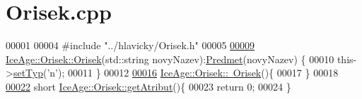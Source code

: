 \hypertarget{Orisek_8cpp_source}{}\section{Orisek.\+cpp}
\label{Orisek_8cpp_source}

\begin{DoxyCode}
00001 
00004 \textcolor{preprocessor}{#include "../hlavicky/Orisek.h"}
00005 
\hypertarget{Orisek_8cpp_source.tex_l00009}{}\hyperlink{classIceAge_1_1Orisek_ab01a1d98a4f04839d1110b14335f9007}{00009} \hyperlink{classIceAge_1_1Orisek_ab01a1d98a4f04839d1110b14335f9007}{IceAge::Orisek::Orisek}(std::string novyNazev):\hyperlink{classIceAge_1_1Predmet}{Predmet}(novyNazev) \{
00010     this->\hyperlink{classIceAge_1_1Predmet_af69bf7c4e8cb75493c90deeaa2afd03c}{setTyp}(\textcolor{charliteral}{'n'});
00011 \}
00012 
\hypertarget{Orisek_8cpp_source.tex_l00016}{}\hyperlink{classIceAge_1_1Orisek_a4180472fce3b7381d49244fd76954d95}{00016} \hyperlink{classIceAge_1_1Orisek_a4180472fce3b7381d49244fd76954d95}{IceAge::Orisek::~Orisek}()\{
00017 \}
00018 
\hypertarget{Orisek_8cpp_source.tex_l00022}{}\hyperlink{classIceAge_1_1Orisek_aee44e1de3168d98f5da635476ffd9560}{00022}  \textcolor{keywordtype}{short} \hyperlink{classIceAge_1_1Orisek_aee44e1de3168d98f5da635476ffd9560}{IceAge::Orisek::getAtribut}()\{
00023     \textcolor{keywordflow}{return} 0;
00024  \}
\end{DoxyCode}
